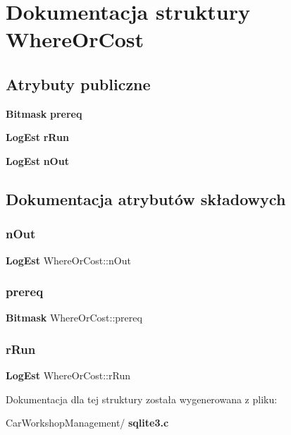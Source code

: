 \section{Dokumentacja struktury Where\+Or\+Cost}
\label{struct_where_or_cost}
\subsection*{Atrybuty publiczne}
\begin{DoxyCompactItemize}
\item 
\textbf{ Bitmask} \textbf{ prereq}
\item 
\textbf{ Log\+Est} \textbf{ r\+Run}
\item 
\textbf{ Log\+Est} \textbf{ n\+Out}
\end{DoxyCompactItemize}


\subsection{Dokumentacja atrybutów składowych}
\mbox{\label{struct_where_or_cost_af2305e66af19f5cc067178bcc4fb34a8}} 
\subsubsection{nOut}
{\footnotesize\ttfamily \textbf{ Log\+Est} Where\+Or\+Cost\+::n\+Out}

\mbox{\label{struct_where_or_cost_a42609e928af86f1783c1e579873b2b4d}} 
\subsubsection{prereq}
{\footnotesize\ttfamily \textbf{ Bitmask} Where\+Or\+Cost\+::prereq}

\mbox{\label{struct_where_or_cost_ac79c4a236da795623ec2a40592fe2617}} 
\subsubsection{rRun}
{\footnotesize\ttfamily \textbf{ Log\+Est} Where\+Or\+Cost\+::r\+Run}



Dokumentacja dla tej struktury została wygenerowana z pliku\+:\begin{DoxyCompactItemize}
\item 
Car\+Workshop\+Management/\textbf{ sqlite3.\+c}\end{DoxyCompactItemize}
